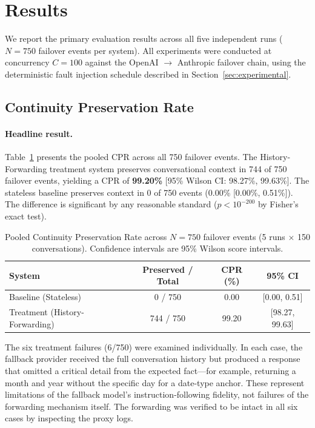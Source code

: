\section{Results}
\label{sec:results}

We report the primary evaluation results across all five independent runs ($N = 750$ failover events per system). All experiments were conducted at concurrency $C = 100$ against the OpenAI $\rightarrow$ Anthropic failover chain, using the deterministic fault injection schedule described in Section~\ref{sec:experimental}.

\subsection{Continuity Preservation Rate}

\paragraph{Headline result.}
Table~\ref{tab:cpr_pooled} presents the pooled CPR across all 750 failover events. The History-Forwarding treatment system preserves conversational context in 744 of 750 failover events, yielding a CPR of \textbf{99.20\%} [95\% Wilson CI: 98.27\%, 99.63\%]. The stateless baseline preserves context in 0 of 750 events (0.00\% [0.00\%, 0.51\%]). The difference is significant by any reasonable standard ($p < 10^{-200}$ by Fisher's exact test).

\begin{table}[t]
\centering
\caption{Pooled Continuity Preservation Rate across $N = 750$ failover events (5 runs $\times$ 150 conversations). Confidence intervals are 95\% Wilson score intervals.}
\label{tab:cpr_pooled}
\small
\begin{tabular}{lccc}
\toprule
\textbf{System} & \textbf{Preserved / Total} & \textbf{CPR (\%)} & \textbf{95\% CI} \\
\midrule
Baseline (Stateless)            & 0 / 750   & 0.00  & [0.00, 0.51] \\
Treatment (History-Forwarding)  & 744 / 750 & 99.20 & [98.27, 99.63] \\
\bottomrule
\end{tabular}
\end{table}

The six treatment failures (6/750) were examined individually. In each case, the fallback provider received the full conversation history but produced a response that omitted a critical detail from the expected fact---for example, returning a month and year without the specific day for a date-type anchor. These represent limitations of the fallback model's instruction-following fidelity, not failures of the forwarding mechanism itself. The forwarding was verified to be intact in all six cases by inspecting the proxy logs.

